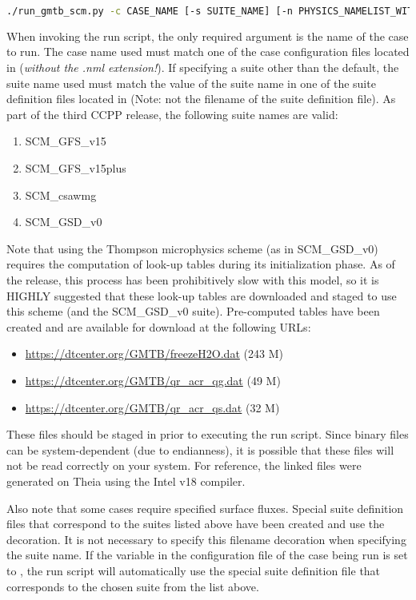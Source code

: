 \begin{lstlisting}[language=bash]
./run_gmtb_scm.py -c CASE_NAME [-s SUITE_NAME] [-n PHYSICS_NAMELIST_WITH_PATH] [-g]
\end{lstlisting}

When invoking the run script, the only required argument is the name of the case to run. The case name used must match one of the case configuration files located in  (\emph{without the .nml extension!}). If specifying a suite other than the default, the suite name used must match the value of the suite name in one of the suite definition files located in  (Note: not the filename of the suite definition file). As part of the third CCPP release, the following suite names are valid:
\begin{enumerate}
\item SCM\_GFS\_v15
\item SCM\_GFS\_v15plus
\item SCM\_csawmg
\item SCM\_GSD\_v0
\end{enumerate}

Note that using the Thompson microphysics scheme (as in SCM\_GSD\_v0) requires the computation of look-up tables during its initialization phase. As of the release, this process has been prohibitively slow with this model, so it is HIGHLY suggested that these look-up tables are downloaded and staged to use this scheme (and the SCM\_GSD\_v0 suite). Pre-computed tables have been created and are available for download at the following URLs:
\begin{itemize}
\item \url{https://dtcenter.org/GMTB/freezeH2O.dat} (243 M)
\item \url{https://dtcenter.org/GMTB/qr_acr_qg.dat} (49 M)
\item \url{https://dtcenter.org/GMTB/qr_acr_qs.dat} (32 M)
\end{itemize}
These files should be staged in  prior to executing the run script. Since binary files can be system-dependent (due to endianness), it is possible that these files will not be read correctly on your system. For reference, the linked files were generated on Theia using the Intel v18 compiler.

Also note that some cases require specified surface fluxes. Special suite definition files that correspond to the suites listed above have been created and use the  decoration. It is not necessary to specify this filename decoration when specifying the suite name. If the  variable in the configuration file of the case being run is set to , the run script will automatically use the special suite definition file that corresponds to the chosen suite from the list above.

